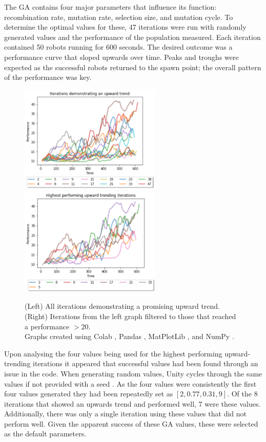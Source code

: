 \documentclass{article}
\begin{document}
The GA contains four major parameters that influence its function: recombination rate, mutation rate, selection size, and mutation cycle. To determine the optimal values for these, 47 iterations were run with randomly generated values and the performance of the population measured. Each iteration contained 50 robots running for 600 seconds.
The desired outcome was a performance curve that sloped upwards over time. Peaks and troughs were expected as the successful robots returned to the spawn point; the overall pattern of the performance was key. 
\begin{figure}[H]
\centering
\centerline{
\includegraphics[width=0.6\textwidth]{gaPatternIterations}
\includegraphics[width=0.6\textwidth]{gafilteredIterations}
}
\caption{(Left) All iterations demonstrating a promising upward trend.\\
(Right) Iterations from the left graph filtered to those that reached a performance $>20$.\\
Graphs created using Colab \citep{colab}, Pandas \citep{pd}, MatPlotLib \citep{plt}, and NumPy \citep{np}.}
\end{figure}

Upon analysing the four values being used for the highest performing upward-trending iterations it appeared that successful values had been found through an issue in the code. When generating random values, Unity cycles through the same values if not provided with a seed . As the four values were consistently the first four values generated they had been repeatedly set as $[2, 0.77, 0.31, 9]$. Of the 8 iterations that showed an upwards trend and performed well, 7 were these values. Additionally, there was only a single iteration using these values that did not perform well. Given the apparent success of these GA values, these were selected as the default parameters. \\
\end{document}
